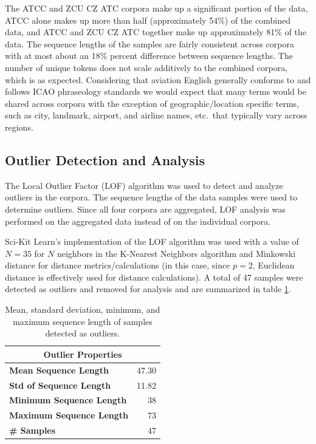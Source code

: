 \documentclass[12pt]{article}
\begin{document}
The ATCC and ZCU CZ ATC corpora make up a significant portion of the data, ATCC alone makes up more than half (approximately 54\%) of the combined
data, and ATCC and ZCU CZ ATC together make up approximately 81\% of the data. The sequence lengths of the samples are fairly consistent across
corpora with at most about an 18\% percent difference between sequence lengths. The number of unique tokens does not scale additively to the
combined corpora, which is as expected. Considering that aviation English generally conforms to and follows ICAO phraseology standards we would expect
that many terms would be shared across corpora with the exception of geographic/location specific terms, such as city, landmark, airport, and airline
names, etc.~that typically vary across regions.

\subsection{Outlier Detection and Analysis}\label{sec:outliers}
The Local Outlier Factor (LOF) algorithm \cite{breunig_lof_2000} was used to detect and analyze outliers in the corpora. The sequence lengths of the
data samples were used to determine outliers. Since all four corpora are aggregated, LOF analysis was performed on the aggregated data instead of on
the individual corpora.

Sci-Kit Learn's \cite{pedregosa_scikit-learn_2011} implementation of the LOF algorithm was used with a value of \(N = 35\) for \(N\) neighbors in the
K-Nearest Neighbors algorithm and Minkowski distance for distance metrics/calculations (in this case, since \(p=2\), Euclidean distance is effectively
used for distance calculations). A total of 47 samples were detected as outliers and removed for analysis and are summarized in table
\ref{tab:outlier_stats}.

\begin{table}[!t]
    \centering
    \begin{tabular}{l | r}
        \toprule
        \multicolumn{2}{c}{Outlier Properties}   \\
        \midrule
        \textbf{Mean Sequence Length}    & 47.30 \\
        \textbf{Std of Sequence Length}  & 11.82 \\
        \textbf{Minimum Sequence Length} & 38    \\
        \textbf{Maximum Sequence Length} & 73    \\
        \textbf{\# Samples}              & 47    \\
        \bottomrule
    \end{tabular}
    \caption{Mean, standard deviation, minimum, and maximum sequence length of samples detected as outliers.}
    \label{tab:outlier_stats}
\end{table}
\end{document}
